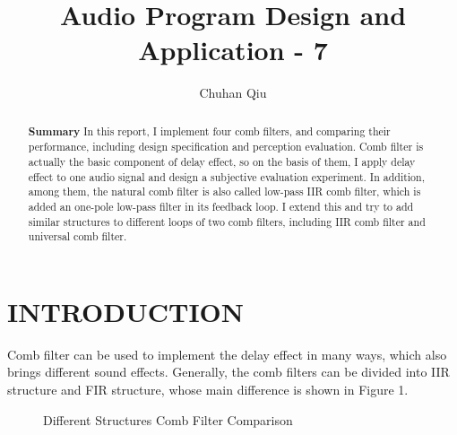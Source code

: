 \documentclass[a4paper]{tufte-handout} %
\title{Audio Program Design and Application - 7}
\author{Chuhan Qiu}
\begin{document}
\maketitle %


\begin{abstract}
	\textbf{Summary}
In this report, I implement four comb filters, and comparing their performance, including design specification and perception evaluation. Comb filter is actually the basic component of delay effect, so on the basis of them, I apply delay effect to one audio signal and design a subjective evaluation experiment. In addition, among them, the natural comb filter is also called low-pass IIR comb filter, which is added an one-pole low-pass filter in its feedback loop. I extend this and try to add similar structures to different loops of two comb filters, including IIR comb filter and universal comb filter.
\end{abstract}


\section{INTRODUCTION}
Comb filter can be used to implement the delay effect in many ways, which also brings different sound effects. Generally, the comb filters can be divided into IIR structure and FIR structure, whose main difference is shown in Figure 1.

\begin{figure}[h!]
    \centering
    \caption{Different Structures Comb Filter Comparison}
\end{figure}
\end{document}
